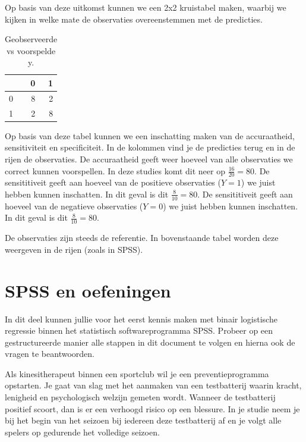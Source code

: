 \documentclass[
]{book}
\theoremstyle{definition}
\theoremstyle{definition}
\theoremstyle{definition}
\theoremstyle{definition}
\theoremstyle{remark}
\begin{document}
Op basis van deze uitkomst kunnen we een 2x2 kruistabel maken, waarbij we kijken in welke mate de observaties overeenstemmen met de predicties.

\begin{table}

\caption{\label{tab:kruiseval}Geobserveerde vs voorspelde y.}
\centering
\begin{tabular}[t]{lrr}
\toprule
  & 0 & 1\\
\midrule
0 & 8 & 2\\
1 & 2 & 8\\
\bottomrule
\end{tabular}
\end{table}

Op basis van deze tabel kunnen we een inschatting maken van de accuraatheid, sensitiviteit en specificiteit. In de kolommen vind je de predicties terug en in de rijen de observaties. De accuraatheid geeft weer hoeveel van alle observaties we correct kunnen voorspellen. In deze studies komt dit neer op \(\frac{16}{20} = 80%
\). De sensititiveit geeft aan hoeveel van de positieve observaties (\(Y = 1\)) we juist hebben kunnen inschatten. In dit geval is dit \(\frac{8}{10} = 80%
\). De sensititiveit geeft aan hoeveel van de negatieve observaties (\(Y = 0\)) we juist hebben kunnen inschatten. In dit geval is dit \(\frac{8}{10} = 80%
\).

De observaties zijn steeds de referentie. In bovenstaande tabel worden deze weergeven in de rijen (zoals in SPSS).

\hypertarget{spss-en-oefeningen-1}{%
\section*{SPSS en oefeningen}\label{spss-en-oefeningen-1}}


In dit deel kunnen jullie voor het eerst kennis maken met binair logistische regressie binnen het statistisch softwareprogramma SPSS. Probeer op een gestructureerde manier alle stappen in dit document te volgen en hierna ook de vragen te beantwoorden.

Als kinesitherapeut binnen een sportclub wil je een preventieprogramma opstarten. Je gaat van slag met het aanmaken van een testbatterij waarin kracht, lenigheid en psychologisch welzijn gemeten wordt. Wanneer de testbatterij positief scoort, dan is er een verhoogd risico op een blessure. In je studie neem je bij het begin van het seizoen bij iedereen deze testbatterij af en je volgt alle spelers op gedurende het volledige seizoen.
\end{document}
